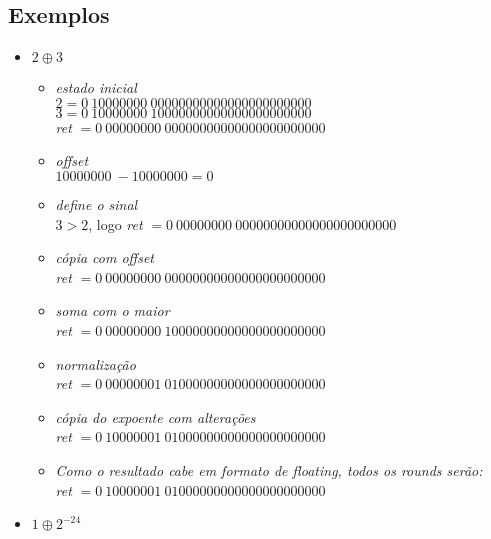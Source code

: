 \documentclass{article}
\begin{document}
\subsection*{Exemplos}
\begin{itemize}
\item $2 \oplus 3$
    \begin{itemize}
        
    \item \textit{estado inicial} \\    
    $2 = {0}\ {10000000}\ {00000000000000000000000}$ \\
    $3 = {0}\ {10000000}\ {10000000000000000000000}$ \\
    \textit{ret} $= {0}\ {00000000}\ {00000000000000000000000}$ \\

    \item \textit{offset} \\
    ${10000000}\ - {10000000} = 0$
    
    \item \textit{define o sinal} \\
    $ 3 > 2$, logo \textit{ret} $= {0}\ {00000000}\ {00000000000000000000000}$
      
    \item \textit{cópia com offset} \\
    \textit{ret} $= {0}\ {00000000}\ {00000000000000000000000}$
      
    \item \textit{soma com o maior} \\
    \textit{ret} $= {0}\ {00000000}\ {10000000000000000000000}$

    \item \textit{normalização} \\
    \textit{ret} $= {0}\ {00000001}\ {01000000000000000000000}$
    
    \item \textit{cópia do expoente com alterações} \\
    \textit{ret} $= {0}\ {10000001}\ {01000000000000000000000}$

    \item \textit{Como o resultado cabe em formato de floating, todos os rounds serão:} \\
    \textit{ret} $= {0}\ {10000001}\ {01000000000000000000000}$
    \end{itemize}

\item $1 \oplus 2^{-24} $ 
    \begin{itemize}
        

\end{itemize}
\end{itemize}
\end{document}

